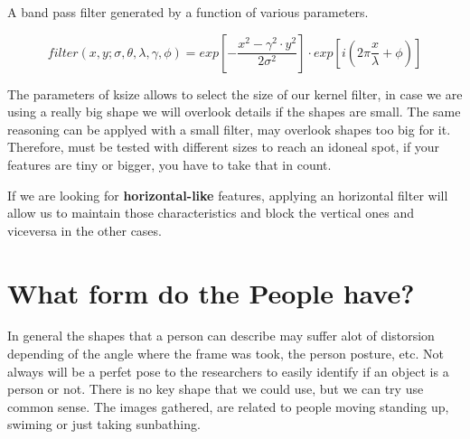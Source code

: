 \documentclass[11pt]{article}
\begin{document}


A band pass filter generated by a function of various parameters.

\begin{equation}
    filter(x,y;\sigma,\theta,\lambda,\gamma,\phi) = exp [ - \frac{x^2 - \gamma ^2 \cdot y^2}{2 \sigma^2} ] \cdot exp [ i (2 \pi \frac{x}{\lambda} + \phi) ] 
\end{equation}


The parameters of ksize allows to select the size of our kernel filter, in case we are using a really big shape we will overlook details if the shapes are small. The same reasoning can be applyed with a small filter, may overlook shapes too big for it. Therefore, must be tested with different sizes to reach an idoneal spot, if your features are tiny or bigger, you have to take that in count.

If we are looking for \textbf{horizontal-like} features, applying an horizontal filter will allow us to maintain those characteristics and block the vertical ones and viceversa in the other cases.


\section{What form do the People have?}

In general the shapes that a person can describe may suffer alot of distorsion depending of the angle where the frame was took, the person posture, etc. Not always will be a perfet pose to the researchers to easily identify if an object is a person or not. There is no key shape that we could use, but we can try use common sense. The images gathered, are related to people moving standing up, swiming or just taking sunbathing.
\end{document}
